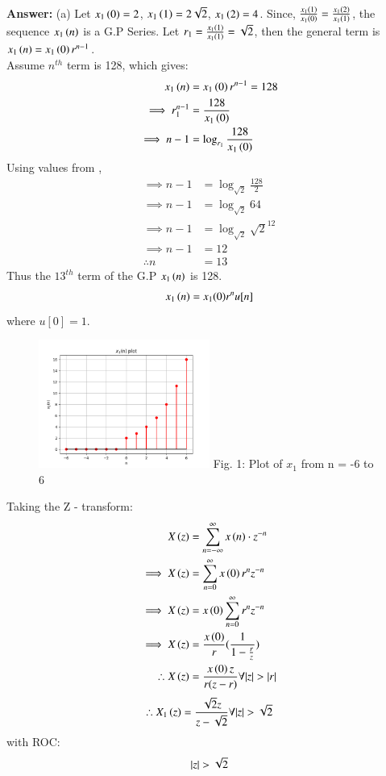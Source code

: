 \documentclass[journal,12pt,twocolumn]{IEEEtran}
\theoremstyle{remark}
\begin{document}
\textbf{Answer:} (a) Let $x_1\left(0\right) = 2$, $x_1\left(1\right) = 2\sqrt{2}$, $x_1\left(2\right) = 4$.
Since, $\frac{x_1\left(1\right)}{x_1\left(0\right)} = \frac{x_1\left(2\right)}{x_1\left(1\right)}$, the sequence $x_1\left(n\right)$ is a G.P Series.
Let $r_1 = \frac{x_1\left(1\right)}{x_1\left(1\right)} = \sqrt{2}$, then the general term is $x_1\left(n\right) = x_1\left(0\right) r^{n-1}$.\\
Assume $n^{th}$ term is 128, which gives: 
\begin{align}
    x_1\left(n\right) &= x_1\left(0\right) r^{n-1} = 128\\
    \implies r_1^{n-1} &= \frac{128}{x_1\left(0\right)}\\
    \implies n - 1 &= \log_{r_1}{\frac{128}{x_1\left(0\right)}}
\end{align}
Using values from , 
\begin{align}
    \implies n - 1 &= \log_{\sqrt{2}}{\frac{128}{2}}\\
    \implies n - 1 &= \log_{\sqrt{2}}{64}\\
    \implies n - 1 &= \log_{\sqrt{2}}{\sqrt{2}^{12}}\\
    \implies n - 1 &= 12\\
    \therefore n &= 13
\end{align}
Thus the $13^{th}$ term of the G.P $x_1\left(n\right)$ is 128.\\ 
\begin{align} x_1\left(n\right) = x_1(0)r^{n}u[n] \end{align} where $u[0] = 1$.
\begin{figure}[h!]
    \centering
    \includegraphics[width=0.5\textwidth]{figs/a.png}
    Fig. 1: Plot of $x_1$ from n = -6 to 6
    \label{fig:img1}
\end{figure}
Taking the Z - transform:
\begin{align}
    X\left(z\right) &= \sum_{n = -\infty}^{\infty}{x\left(n\right) \cdot z^{-n}}\\
    \implies X\left(z\right) &= \sum_{n = 0}^{\infty}{x\left(0\right)r^{n}z^{-n}}\\
    \implies X\left(z\right) &= x\left(0\right)\sum_{n = 0}^{\infty}{r^n z^{-n}}\\
    \implies X\left(z\right) &= \frac{x\left(0\right)}{r}(\frac{1}{1 - \frac{r}{z}})\\
    \therefore X\left(z\right) &= \frac{x\left(0\right)z}{r(z - r)} \forall {\left\vert z\right\vert > \left\vert r\right\vert} \label{zresult}
\end{align}
\begin{align}
    \therefore X_1\left(z\right) = \frac{\sqrt{2}z}{z - \sqrt{2}}\forall {\left\vert z\right\vert > \sqrt{2}}
\end{align}
with ROC: \[ \left\vert z\right\vert > \sqrt{2} \]
\end{document}
